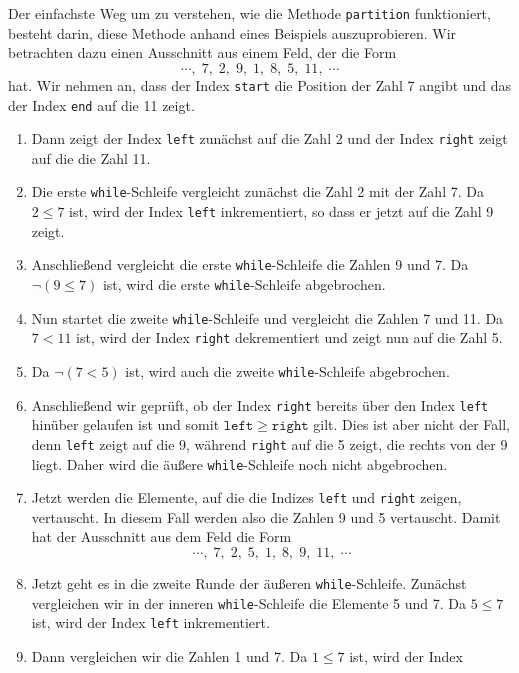 Der einfachste Weg um zu verstehen, wie die Methode \texttt{partition} funktioniert,
besteht darin, diese Methode anhand eines Beispiels auszuprobieren.  Wir betrachten dazu 
einen Ausschnitt aus einem Feld, der die Form 
\[ \cdots,\; 7,\; 2,\; 9,\; 1,\; 8,\; 5,\; 11,\;\cdots \]
hat.  Wir nehmen an, dass der Index \texttt{start} die Position der Zahl 7 angibt und das
der Index \texttt{end} auf die 11 zeigt.  
\begin{enumerate}
\item Dann zeigt der Index \texttt{left} zun\"achst auf
      die Zahl 2 und der Index \texttt{right} zeigt auf die die Zahl 11.
\item Die erste \texttt{while}-Schleife vergleicht zun\"achst die Zahl 2 mit der Zahl 7.
      Da $2 \leq 7$ ist, wird der Index \texttt{left} inkrementiert, so dass er jetzt auf 
      die Zahl 9 zeigt.
\item Anschlie{\ss}end vergleicht die  erste \texttt{while}-Schleife die Zahlen 9 und 7.
      Da $\neg(9 \leq 7)$ ist, wird die erste \texttt{while}-Schleife abgebrochen.
\item Nun startet die zweite \texttt{while}-Schleife und vergleicht die Zahlen 7 und 11.
      Da $7 < 11$ ist, wird der Index \texttt{right} dekrementiert und zeigt nun auf die
      Zahl 5.
\item Da $\neg (7 < 5)$ ist, wird auch die zweite \texttt{while}-Schleife abgebrochen.
\item Anschlie{\ss}end wir gepr\"uft, ob der Index \texttt{right} bereits \"uber den Index
      \texttt{left} hin\"uber gelaufen ist und somit $\mathtt{left} \geq \mathtt{right}$
      gilt.   Dies ist aber nicht der Fall, denn \texttt{left} zeigt auf die 9,
      w\"ahrend \texttt{right} auf die 5 zeigt, die rechts von der 9 liegt.
      Daher wird die \"au{\ss}ere \texttt{while}-Schleife noch nicht abgebrochen.
\item Jetzt werden die Elemente, auf die die Indizes \texttt{left} und \texttt{right}
      zeigen, vertauscht.  In diesem Fall werden also die Zahlen 9 und 5 vertauscht.
      Damit hat der Ausschnitt aus dem Feld die Form
      \[ \cdots,\; 7,\; 2,\; 5,\; 1,\; 8,\; 9,\; 11,\;\cdots \]
\item Jetzt geht es in die zweite Runde der \"au{\ss}eren \texttt{while}-Schleife.
      Zun\"achst vergleichen wir in der inneren \texttt{while}-Schleife die Elemente
      5 und 7.  Da $5 \leq 7$ ist, wird der Index \texttt{left} inkrementiert.
\item Dann vergleichen wir die Zahlen 1 und 7.  Da $1 \leq 7$ ist, wird der Index

\end{enumerate}
